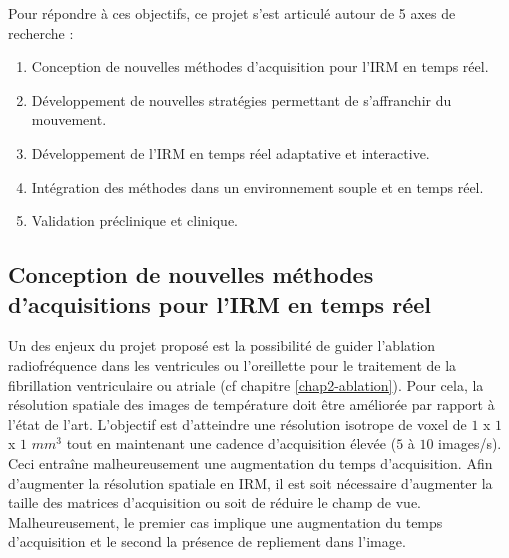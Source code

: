 Pour répondre à ces objectifs, ce projet s’est articulé autour de 5 axes de recherche :

\begin{enumerate}
\item Conception de nouvelles méthodes d’acquisition pour l’IRM en temps réel.
\item Développement de nouvelles stratégies permettant de s’affranchir du mouvement.
\item Développement de l’IRM en temps réel adaptative et interactive.
\item Intégration des méthodes dans un environnement souple et en temps réel.
\item Validation préclinique et clinique.
\end{enumerate}

\subsection{Conception de nouvelles méthodes d'acquisitions pour l'IRM en temps réel}

Un des enjeux du projet proposé est la possibilité de guider l’ablation radiofréquence dans les ventricules ou l'oreillette pour le traitement de la fibrillation ventriculaire ou atriale (cf chapitre \ref{chap2-ablation}). Pour cela, la résolution spatiale des images de température doit être améliorée par rapport à l’état de l’art. L’objectif est d’atteindre une résolution isotrope de voxel de $1$ x $1$ x $1$ $mm^3$ tout en maintenant une cadence d’acquisition élevée ($5$ à $10$ images/s). Ceci entraîne malheureusement une augmentation du temps d’acquisition. Afin d’augmenter la résolution spatiale en IRM, il est soit nécessaire d’augmenter la taille des matrices d’acquisition ou soit de réduire le champ de vue. Malheureusement, le premier cas implique une augmentation du temps d’acquisition et le second la présence de repliement dans l’image.\\